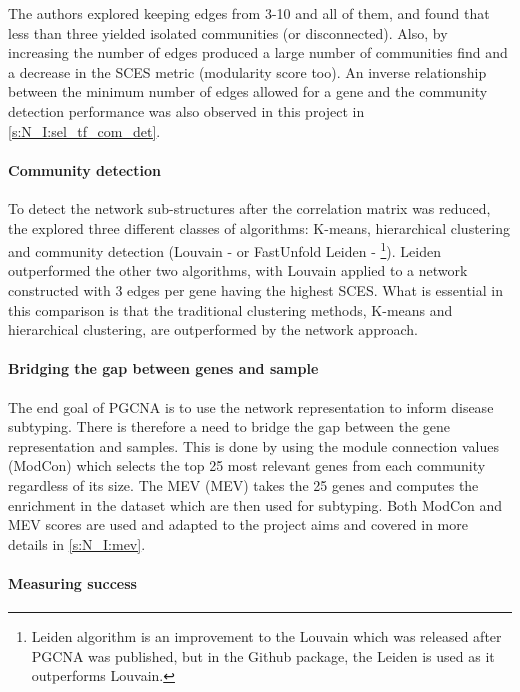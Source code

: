 The authors explored keeping edges from 3-10 and all of them, and found that less than three yielded isolated communities (or disconnected). Also, by increasing the number of edges produced a large number of communities find and a decrease in the SCES metric (modularity score too). An inverse relationship between the minimum number of edges allowed for a gene and the community detection performance was also observed in this project in \cref{s:N_I:sel_tf_com_det}.

\paragraph*{Community detection}

To detect the network sub-structures after the correlation matrix was reduced, the \citet{Care2019-ij} explored three different classes of algorithms: K-means, hierarchical clustering and community detection (Louvain - \cite{Blondel2008-ik} or FastUnfold Leiden - \cite{Traag2019-ne}\footnote{Leiden algorithm is an improvement to the Louvain which was released after PGCNA was published, but in the Github package, the Leiden is used as it outperforms Louvain.}). Leiden outperformed the other two algorithms, with Louvain applied to a network constructed with 3 edges per gene having the highest SCES. What is essential in this comparison is that the traditional clustering methods, K-means and hierarchical clustering, are outperformed by the network approach.

\paragraph*{Bridging the gap between genes and sample}

The end goal of PGCNA is to use the network representation to inform disease subtyping. There is therefore a need to bridge the gap between the gene representation and samples. This is done by using the module connection values (ModCon) which selects the top 25 most relevant genes from each community regardless of its size. The \gls{MEV} (MEV) takes the 25 genes and computes the enrichment in the dataset which are then used for subtyping. Both ModCon and MEV scores are used and adapted to the project aims and covered in more details in \cref{s:N_I:mev}.

\paragraph*{Measuring success} 


